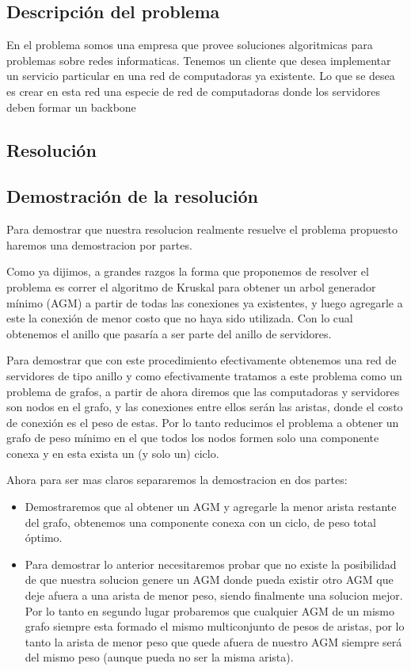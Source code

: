 \subsection{Descripci\'on del problema}

En el problema somos una empresa que provee soluciones algoritmicas para problemas sobre redes informaticas. Tenemos un cliente que desea implementar un servicio particular en una red de computadoras ya existente.
Lo que se desea es crear en esta red una especie de red de computadoras donde los servidores deben formar un backbone 

\subsection{Resoluci\'on}



\subsection{Demostraci\'on de la resoluci\'on}

Para demostrar que nuestra resolucion realmente resuelve el problema propuesto haremos una demostracion por partes.

Como ya dijimos, a grandes razgos la forma que proponemos de resolver el problema es correr el algoritmo de Kruskal para obtener un arbol generador mínimo (AGM) a partir de todas las conexiones ya existentes, y luego agregarle a este la conexión de menor costo que no haya sido utilizada. Con lo cual obtenemos el anillo que pasaría a ser parte del anillo de servidores.

Para demostrar que con este procedimiento efectivamente obtenemos una red de servidores de tipo anillo y como efectivamente tratamos a este problema como un problema de grafos, a partir de ahora diremos que las computadoras y servidores son nodos en el grafo, y las conexiones entre ellos serán las aristas, donde el costo de conexión es el peso de estas. Por lo tanto reducimos el problema a obtener un grafo de peso mínimo en el que todos los nodos formen solo una componente conexa y en esta exista un (y solo un) ciclo.

Ahora para ser mas claros separaremos la demostracion en dos partes:

\begin{itemize}
\item Demostraremos que al obtener un AGM y agregarle la menor arista restante del grafo, obtenemos una componente conexa con un ciclo, de peso total óptimo.
\item Para demostrar lo anterior necesitaremos probar que no existe la posibilidad de que nuestra solucion genere un AGM donde pueda existir otro AGM que deje afuera a una arista de menor peso, siendo finalmente una solucion mejor. Por lo tanto en segundo lugar probaremos que cualquier AGM de un mismo grafo siempre esta formado el mismo multiconjunto de pesos de aristas, por lo tanto la arista de menor peso que quede afuera de nuestro AGM siempre será del mismo peso (aunque pueda no ser la misma arista).
\end{itemize}

